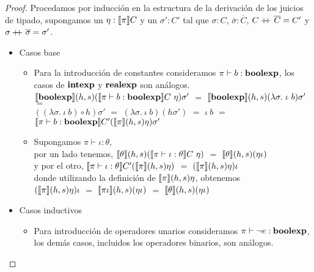 \begin{proof}
Procedamos por inducci\'on en la estructura de la derivaci\'on de los juicios de tipado,
supongamos un $\eta : \llbracket \pi \rrbracket C$ y un $\sigma' : C'$ tal que $\sigma : C$,
$\overline{\sigma} : \overline{C}$, $C +\kern-1.3ex+\kern0.8ex \overline{C} = C'$ y 
$\sigma +\kern-1.3ex+\kern0.8ex \overline{\sigma} = \sigma'$.

\begin{itemize}

\item Casos base
\begin{itemize}
\item Para la introducci\'on de constantes consideramos $\pi \vdash b : \textbf{boolexp}$, los
casos de $\textbf{intexp}$ y $\textbf{realexp}$ son an\'alogos.\\

$\llbracket \textbf{boolexp} \rrbracket(h,s)(\llbracket \pi \vdash b : \textbf{boolexp} \rrbracket C \ \eta) \sigma'$ $=$
$\semBrcks{\boolexp}(h,s)(\lambda \sigma. \ \iota \ b) \sigma'$ $=$ \\
$((\lambda \sigma. \ \iota \ b) \circ h)\sigma'$ $=$
$(\lambda \sigma. \ \iota \ b) (h \sigma')$ $=$
$\iota \ b$ $=$ $\llbracket \pi \vdash b : \textbf{boolexp} \rrbracket C'(\llbracket \pi \rrbracket(h,s)\eta)\sigma'$

\item Supongamos $\pi \vdash \iota : \theta$,\\

por un lado tenemos,
$\llbracket \theta \rrbracket(h,s)(\llbracket \pi \vdash \iota : \theta \rrbracket C \ \eta)$ $=$
$\llbracket \theta \rrbracket(h,s)(\eta \iota)$ \\

y por el otro, $\llbracket \pi \vdash \iota : \theta \rrbracket C'(\llbracket \pi \rrbracket(h,s)\eta)$ $=$
$(\llbracket \pi \rrbracket(h,s)\eta) \iota$ \\

donde utilizando la definici\'on de $\llbracket \pi \rrbracket(h,s)\eta$, obtenemos\\

$(\llbracket \pi \rrbracket(h,s)\eta) \iota$ $=$ $\llbracket \pi\iota \rrbracket(h,s)(\eta \iota)$ $=$
$\llbracket \theta \rrbracket(h,s)(\eta \iota)$

\end{itemize}

\item Casos inductivos
\begin{itemize}
\item Para introducci\'on de operadores unarios consideramos $\pi \vdash \neg e : \textbf{boolexp}$, los
dem\'as casos, incluidos los operadores binarios, son an\'alogos.\\


\end{itemize}
\end{itemize}
\end{proof}
